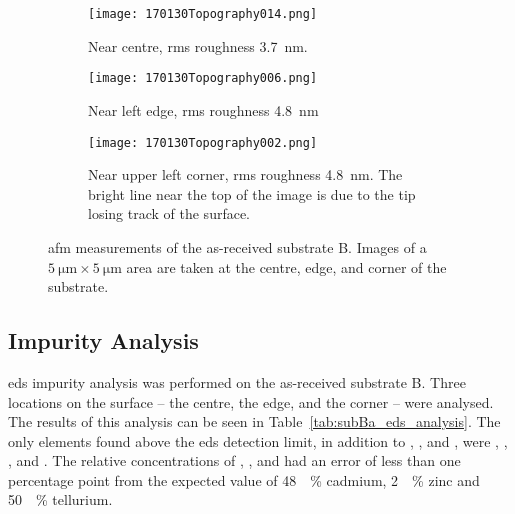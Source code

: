 \begin{figure}[htbp]
    \centering
    \begin{subfigure}[t]{\linewidth}
    \centering
        \texttt{[image: 170130Topography014.png]}
        \caption{Near centre, \ac{rms} roughness \SI{3,7}{\nano\metre}.}
    \end{subfigure}
    \par\bigskip
    \begin{subfigure}[t]{\linewidth}
    \centering
        \texttt{[image: 170130Topography006.png]}
        \caption{Near left edge, \ac{rms} roughness \SI{4,8}{\nano\metre}}
    \end{subfigure}
    \par\bigskip
    \begin{subfigure}[t]{\linewidth}
    \centering
        \texttt{[image: 170130Topography002.png]}
        \caption{Near upper left corner, \ac{rms} roughness \SI{4,8}{\nano\metre}. The bright line near the top of the image is due to the tip losing track of the surface.}
    \end{subfigure}
    \caption[\Ac{afm} of as-received substrate B.]{\Acf{afm} measurements of the as-received substrate B. Images of a $\SI{5}{\micro\metre}\times\SI{5}{\micro\metre}$ area are taken at the centre, edge, and corner of the substrate.}\label{fig:afm_subB}
\end{figure} %


\subsection{Impurity Analysis}

\Ac{eds} impurity analysis was performed on the as-received substrate B. Three locations on the surface -- the centre, the edge, and the corner -- were analysed. The results of this analysis can be seen in Table~\ref{tab:subBa_eds_analysis}. The only elements found above the \ac{eds} detection limit, in addition to , , and , were , , , and . The relative concentrations of , , and  had an error of less than one percentage point from the expected value of \SI{48}{\atomic\percent} cadmium, \SI{2}{\atomic\percent} zinc and \SI{50}{\atomic\percent} tellurium.

